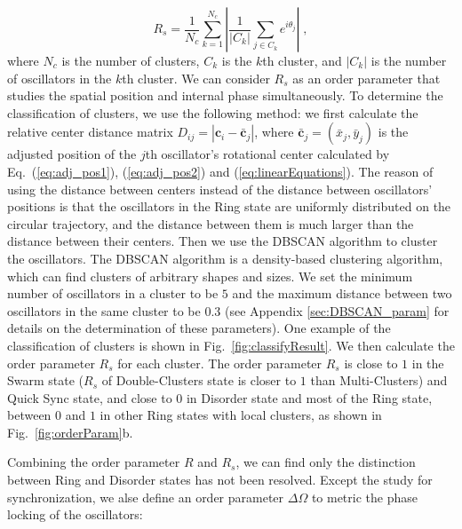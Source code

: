 \documentclass[%
 aip,
 amsmath,amssymb,
 reprint,%
]{revtex4-1}
\begin{document}
\begin{equation}
    R_s=\frac{1}{N_c}\sum_{k=1}^{N_c}{\left| \frac{1}{\left| C_k \right|}\sum_{j\in C_k}{e^{i\theta _j}} \right|}\;,
\end{equation}
where $N_c$ is the number of clusters, $C_k$ is the $k$th cluster, and $\left| C_k \right|$ is the number of oscillators in the $k$th cluster. We can consider $R_s$ as an order parameter that studies the spatial position and internal phase simultaneously.
To determine the classification of clusters, we use the following method: we first calculate the relative center distance matrix $D_{ij}=\left| \mathbf{c}_i-\bar{\mathbf{c}}_j \right|$, where $\bar{\mathbf{c}}_j=\left( \bar{x}_j,\bar{y}_j \right)$ is the adjusted position of the $j$th oscillator's rotational center calculated by Eq.~(\ref{eq:adj_pos1}), (\ref{eq:adj_pos2}) and (\ref{eq:linearEquations}). 
The reason of using the distance between centers instead of the distance between oscillators' positions is that the oscillators in the Ring state are uniformly distributed on the circular trajectory, and the distance between them is much larger than the distance between their centers.
Then we use the DBSCAN algorithm to cluster the oscillators. The DBSCAN algorithm is a density-based clustering algorithm, which can find clusters of arbitrary shapes and sizes. We set the minimum number of oscillators in a cluster to be $5$ and the maximum distance between two oscillators in the same cluster to be $0.3$ (see Appendix \ref{sec:DBSCAN_param} for details on the determination of these parameters). 
One example of the classification of clusters is shown in Fig.~\ref{fig:classifyResult}.
We then calculate the order parameter $R_s$ for each cluster. The order parameter $R_s$ is close to $1$ in the Swarm state ($R_s$ of Double-Clusters state is closer to $1$ than Multi-Clusters) and Quick Sync state, and close to $0$ in Disorder state and most of the Ring state, between $0$ and $1$ in other Ring states with local clusters, as shown in Fig.~\ref{fig:orderParam}b.

Combining the order parameter $R$ and $R_s$, we can find only the distinction between Ring and Disorder states has not been resolved. Except the study for synchronization, we alse define an order parameter $\Delta \Omega$ to metric the phase locking of the oscillators:
\end{document}
